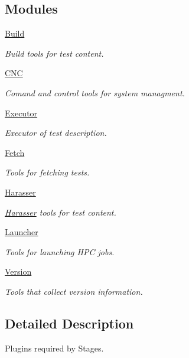 \subsection*{Modules}
\begin{DoxyCompactItemize}
\item 
\hyperlink{group___build}{Build}
\begin{DoxyCompactList}\small\item\em Build tools for test content. \end{DoxyCompactList}\item 
\hyperlink{group___c_n_c}{C\-N\-C}
\begin{DoxyCompactList}\small\item\em Comand and control tools for system managment. \end{DoxyCompactList}\item 
\hyperlink{group___executor}{Executor}
\begin{DoxyCompactList}\small\item\em Executor of test description. \end{DoxyCompactList}\item 
\hyperlink{group___fetch}{Fetch}
\begin{DoxyCompactList}\small\item\em Tools for fetching tests. \end{DoxyCompactList}\item 
\hyperlink{group___harasser}{Harasser}
\begin{DoxyCompactList}\small\item\em \hyperlink{namespace_harasser}{Harasser} tools for test content. \end{DoxyCompactList}\item 
\hyperlink{group___launcher}{Launcher}
\begin{DoxyCompactList}\small\item\em Tools for launching H\-P\-C jobs. \end{DoxyCompactList}\item 
\hyperlink{group___version}{Version}
\begin{DoxyCompactList}\small\item\em Tools that collect version information. \end{DoxyCompactList}\end{DoxyCompactItemize}


\subsection{Detailed Description}
Plugins required by Stages. 